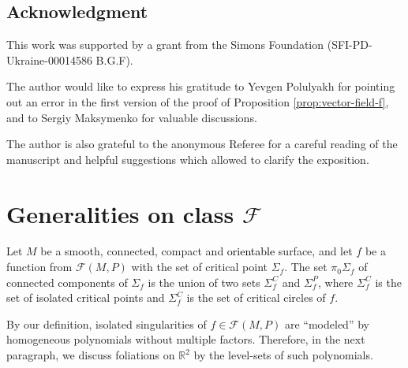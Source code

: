 \documentclass[10pt,reqno]{amsart}
\newcommand{\bbR}{\mathbb{R}}
\newcommand{\F}{\mathcal{F}(M,P)}
\newcommand{\Crit}{\Sigma_f}
\newcommand{\CritP}{\Crit^P}
\newcommand{\CritC}{\Crit^C}
\newcommand{\textr}[1]{\textcolor{black}{#1}}
\begin{document}
\subsection*{Acknowledgment} 
This work was supported by a grant from the Simons Foundation (SFI-PD-Ukraine-00014586 B.G.F). 

The author would like to express his gratitude to Yevgen Polulyakh for pointing out an error in the first version of the proof of Proposition \ref{prop:vector-field-f}, and to Sergiy Maksymenko for valuable discussions.

The author is also grateful to the anonymous Referee for a careful reading of the manuscript and helpful suggestions which allowed to clarify the exposition.



\section{Generalities on class $\mathcal{F}$}\label{sec:Preliminaries}
Let $M$ be a smooth, connected,  compact and \textr{orientable} surface, and let $f$ be a function from $\F$ with the set of critical point $\Crit$. The set $\pi_0 \Crit$ of connected components  of $\Crit$
is the union of two sets $\CritC$ and $\CritP$, where $\CritC$ is the set of  isolated critical points and $\CritC$ is the set of critical circles of $f$.

By our definition, isolated singularities of $f\in \F$ are ``modeled'' by homogeneous polynomials without multiple factors. Therefore, in the next paragraph, we discuss foliations on $\bbR^2$ by the level-sets of such polynomials.
\end{document}
